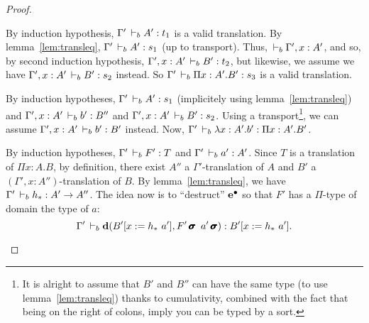 \documentclass[a4paper,english]{lipics-utf8x}
\begin{document}
\begin{proof}
\begin{caselist}
      \begin{graycase}
        \begin{mathc}
        \end{mathc}
        By induction hypothesis, $\Gamma' \,\vdash_b A' : t_1$ is a valid
        translation.
        By lemma~\ref{lem:transleq}, $\Gamma' \,\vdash_b A' : s_1$ (up to transport).
        Thus, $\,\vdash_b \Gamma', x : A'$, and so, by second induction hypothesis,
        $\Gamma', x:A' \,\vdash_b B' : t_2$, but likewise, we assume we have
        $\Gamma', x:A' \,\vdash_b B' : s_2$ instead.
        So $\Gamma' \,\vdash_b \Pi x:A'.B' : s_3$ is a valid translation.
      \end{graycase}

      \begin{graycase}
        \begin{mathc}
        \end{mathc}
        By induction hypotheses, $\Gamma' \,\vdash_b A' : s_1$ (implicitely using
        lemma~\ref{lem:transleq}) and $\Gamma', x:A' \,\vdash_b b' : B''$ and
        $\Gamma', x:A' \,\vdash_b B' : s_2$.
        Using a transport\footnote{It is alright to assume that $B'$ and $B''$
        can have the same type (to use lemma~\ref{lem:transleq})
        thanks to cumulativity, combined with the fact that being on the right
        of colons, imply you can be typed by a sort.},
        we can assume $\Gamma', x:A' \,\vdash_b b' : B'$ instead.
        Now, $\Gamma' \,\vdash_b \lambda x:A'.b' : \Pi x:A'.B'$.
      \end{graycase}

      \nextcase
      \begin{mathc}
      \end{mathc}
      By induction hypotheses, $\Gamma' \,\vdash_b F' : T$ and
      $\Gamma' \,\vdash_b a' : A'$.
      Since $T$ is a translation of $\Pi x:A.B$, by definition, there exist
      $A''$ a $\Gamma'$-translation of $A$ and
      $B'$ a $(\Gamma', x:A'')$-translation of $B$.
      By lemma~\ref{lem:transleq}, we have $\Gamma' \,\vdash_b h_* : A' \to A''$.
      The idea now is to ``destruct'' $\operatorname{\operatorname{\mathbf{e}}^\bullet}$ so that $F'$ has a $\Pi$-type
      of domain the type of $a$:
      \[
        \Gamma' \,\vdash_b \operatorname{\mathbf{d}}(B'[x := h_*\ a'], F'\operatorname{\pmb{\bm{\sigma}}}\ a'\operatorname{\pmb{\bm{\sigma}}}) :
        B'[x := h_*\ a'].
      \]


\end{caselist}
\end{proof}
\end{document}
